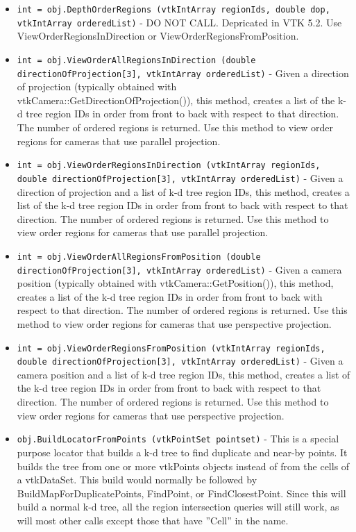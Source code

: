 \begin{itemize}
\item  \verb|int = obj.DepthOrderRegions (vtkIntArray regionIds, double dop, vtkIntArray orderedList)| -  DO NOT CALL.  Depricated in VTK 5.2.  Use ViewOrderRegionsInDirection
 or ViewOrderRegionsFromPosition.

\item  \verb|int = obj.ViewOrderAllRegionsInDirection (double directionOfProjection[3], vtkIntArray orderedList)| -  Given a direction of projection (typically obtained with
 vtkCamera::GetDirectionOfProjection()), this method, creates a list of the
 k-d tree region IDs in order from front to back with respect to that
 direction.  The number of ordered regions is returned.  Use this method to
 view order regions for cameras that use parallel projection.

\item  \verb|int = obj.ViewOrderRegionsInDirection (vtkIntArray regionIds, double directionOfProjection[3], vtkIntArray orderedList)| -  Given a direction of projection and a list of k-d tree region IDs, this
 method, creates a list of the k-d tree region IDs in order from front to
 back with respect to that direction.  The number of ordered regions is
 returned.  Use this method to view order regions for cameras that use
 parallel projection.

\item  \verb|int = obj.ViewOrderAllRegionsFromPosition (double directionOfProjection[3], vtkIntArray orderedList)| -  Given a camera position (typically obtained with vtkCamera::GetPosition()),
 this method, creates a list of the k-d tree region IDs in order from front
 to back with respect to that direction.  The number of ordered regions is
 returned.  Use this method to view order regions for cameras that use
 perspective projection.

\item  \verb|int = obj.ViewOrderRegionsFromPosition (vtkIntArray regionIds, double directionOfProjection[3], vtkIntArray orderedList)| -  Given a camera position and a list of k-d tree region IDs, this method,
 creates a list of the k-d tree region IDs in order from front to back with
 respect to that direction.  The number of ordered regions is returned.  Use
 this method to view order regions for cameras that use perspective
 projection.

\item  \verb|obj.BuildLocatorFromPoints (vtkPointSet pointset)| -  This is a special purpose locator that builds a k-d tree to 
 find duplicate and near-by points.  It builds the tree from 
 one or more vtkPoints objects instead of from the cells of
 a vtkDataSet.  This build would normally be followed by
 BuildMapForDuplicatePoints, FindPoint, or FindClosestPoint.
 Since this will build a normal k-d tree, all the region intersection
 queries will still work, as will most other calls except those that
 have ''Cell'' in the name.


\end{itemize}
